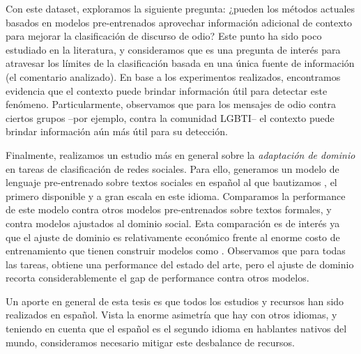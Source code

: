 Con este dataset, exploramos la siguiente pregunta: ¿pueden los métodos actuales basados en modelos pre-entrenados aprovechar información adicional de contexto para mejorar la clasificación de discurso de odio? Este punto ha sido poco estudiado en la literatura, y consideramos que es una pregunta de interés para atravesar los límites de la clasificación basada en una única fuente de información (el comentario analizado). En base a los experimentos realizados, encontramos evidencia que el contexto puede brindar información útil para detectar este fenómeno. Particularmente, observamos que para los mensajes de odio contra ciertos grupos --por ejemplo, contra la comunidad LGBTI-- el contexto puede brindar información aún más útil para su detección.

Finalmente, realizamos un estudio más en general sobre la \emph{adaptación de dominio} en tareas de clasificación de redes sociales. Para ello, generamos un modelo de lenguaje pre-entrenado sobre textos sociales en español al que bautizamos \robertuito{}, el primero disponible y a gran escala en este idioma. Comparamos la performance de este modelo contra otros modelos pre-entrenados sobre textos formales, y contra modelos ajustados al dominio social. Esta comparación es de interés ya que el ajuste de dominio es relativamente económico frente al enorme costo de entrenamiento que tienen construir modelos como \robertuito{}. Observamos que para todas las tareas, \robertuito{} obtiene una performance del estado del arte, pero el ajuste de dominio recorta considerablemente el gap de performance contra otros modelos.

Un aporte en general de esta tesis es que todos los estudios y recursos han sido realizados en español. Vista la enorme asimetría que hay con otros idiomas, y teniendo en cuenta que el español es el segundo idioma en hablantes nativos del mundo, consideramos necesario mitigar este desbalance de recursos.